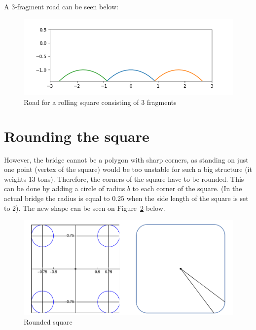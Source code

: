 \documentclass[12pt]{article}
\begin{document}
        A 3-fragment road can be seen below:
        \begin{figure}[H]
            \centering
            \includegraphics[width=\linewidth]{images/road_3.png}
            \caption{Road for a rolling square consisting of 3 fragments}\label{fig:road3}
        \end{figure}

    \section{Rounding the square}

        However, the bridge cannot be a polygon with sharp corners, as standing on just one point (vertex of the square) would be too unstable for such a big structure (it weights 13 tons\cite{bridge_newatlas}). Therefore, the corners of the square have to be rounded. This can be done by adding a circle of radius $b$ to each corner of the square. (In the actual bridge the radius is equal to $0.25$ when the side length of the square is set to $2$). The new shape can be seen on Figure~\ref{fig:rounded_square} below.

        \begin{figure}[H]
            \centering
            \includegraphics[width=0.9\linewidth]{images/rounded_square.png}
            \caption{Rounded square\cite{bridge_wolfram}}\label{fig:rounded_square}
        \end{figure}

\end{document}

